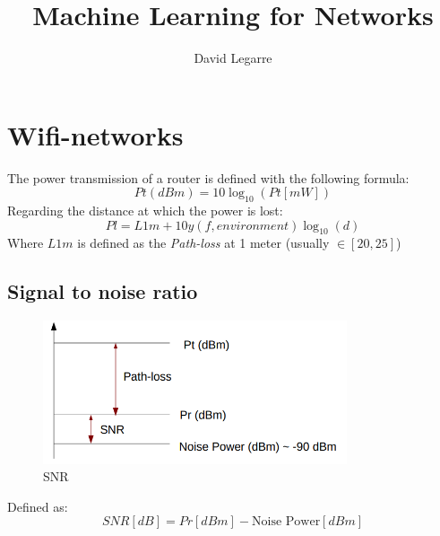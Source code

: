 \documentclass[12pt, a4paper]{report}
\title{Machine Learning for Networks}
\author{David Legarre}
\begin{document}
\maketitle
\chapter{Wifi-networks}
The power transmission of a router is defined with the following formula:
\begin{equation}
   Pt(dBm)=10\log_{10}(Pt[mW])
\end{equation}
Regarding the distance at which the power is lost:
\begin{equation}
   Pl=L1m+10y(f,environment)\log_{10}(d)
\end{equation}
Where $L1m$ is defined as the \textit{Path-loss} at 1 meter (usually $\in\left[ 20,25 \right]$)
\section{Signal to noise ratio}
\begin{figure}[htbp]
   \centering
   \includegraphics[width=0.8\textwidth]{SNR.png}
   \caption{SNR}
   \label{SNR}
\end{figure}
Defined as:
\begin{equation}
   SNR[dB]=Pr[dBm]-\text{Noise Power}[dBm]
\end{equation}


\end{document}

